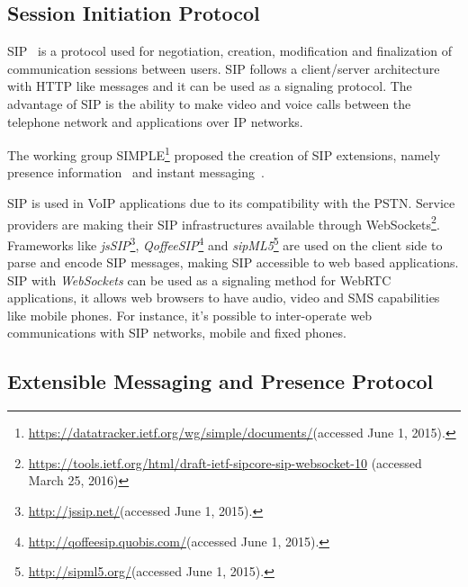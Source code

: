   \subsection{Session Initiation Protocol}

  \ac{SIP}~\cite{rfc3261} is a protocol used for negotiation, creation, modification and finalization of communication sessions between users. \ac{SIP} follows a client/server architecture with \ac{HTTP} like messages and it can be used as a signaling protocol. The advantage of \ac{SIP} is the ability to make video and voice calls between the telephone network and applications over \ac{IP} networks.

  The working group \ac{SIMPLE}\footnote{\url{https://datatracker.ietf.org/wg/simple/documents/}(accessed June 1, 2015).} proposed the creation of \ac{SIP} extensions, namely presence information~\cite{rfc5263} and instant messaging~\cite{rfc3428}.

  \ac{SIP} is used in \ac{VoIP} applications due to its compatibility with the \ac{PSTN}.
  Service providers are making their \ac{SIP} infrastructures available through WebSockets\footnote{\url{https://tools.ietf.org/html/draft-ietf-sipcore-sip-websocket-10} (accessed March 25, 2016)}.
  Frameworks like \emph{jsSIP}\footnote{\url{http://jssip.net/}(accessed June 1, 2015).}, \emph{QoffeeSIP}\footnote{\url{http://qoffeesip.quobis.com/}(accessed June 1, 2015).} and \emph{sipML5}\footnote{\url{http://sipml5.org/}(accessed June 1, 2015).} are used on the client side to parse and encode \ac{SIP} messages, making \ac{SIP} accessible to web based applications. 
  \ac{SIP} with \emph{WebSockets} can be used as a signaling method for \ac{WebRTC} applications, it allows web browsers to have audio, video and \ac{SMS} capabilities like mobile phones. For instance, it's possible to inter-operate web communications with \ac{SIP} networks, mobile and fixed phones.

\subsection{Extensible Messaging and Presence Protocol}

